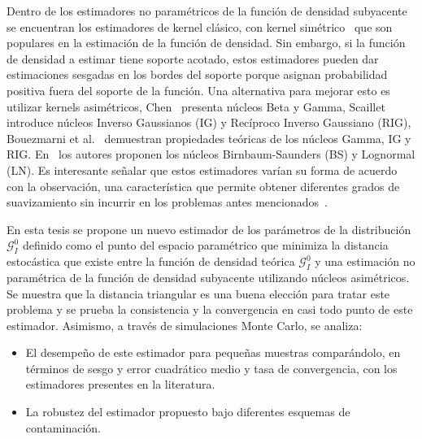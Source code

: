 Dentro de los estimadores no paramétricos de la función de densidad subyacente se encuentran los estimadores de kernel clásico, con kernel simétrico~\cite{Silverman1986} que son populares en la estimación de la función de densidad. Sin embargo, si la función de densidad a estimar tiene soporte acotado, estos estimadores pueden dar estimaciones sesgadas en los bordes del soporte porque asignan probabilidad positiva fuera del soporte de la función. Una alternativa para mejorar esto es utilizar kernels asimétricos, Chen~\cite{chen1999, chensx2000} presenta núcleos Beta y Gamma, Scaillet~\cite {Scaillet2004} introduce núcleos Inverso Gaussianos (IG) y Recíproco Inverso Gaussiano (RIG), Bouezmarni et al.~\cite {bouezmarni2005} demuestran propiedades teóricas de los núcleos Gamma, IG y RIG. En~\cite{Jin2003} los autores proponen los núcleos Birnbaum-Saunders (BS) y Lognormal (LN). Es interesante señalar que  estos estimadores varían su forma de acuerdo con la observación, una característica que permite obtener diferentes grados de suavizamiento sin incurrir en los problemas antes mencionados~\cite{Scaillet2004}. 

En esta tesis se propone un nuevo  estimador de los parámetros de la distribución $\mathcal{G}_I^0$ definido como el punto del espacio paramétrico que minimiza la distancia estocástica que existe entre la función de densidad teórica $\mathcal{G}_I^0$ y una estimación no paramétrica de la función de densidad subyacente utilizando núcleos asimétricos. Se muestra que la distancia triangular es una buena elección para tratar este problema y se prueba la consistencia y la convergencia en casi todo punto de este estimador. Asimismo, a través de simulaciones Monte Carlo, se analiza:

\begin{itemize}
	\item El desempeño de este estimador para pequeñas muestras comparándolo, en términos de sesgo y error cuadrático medio y tasa de convergencia, con los estimadores presentes en la literatura.
	\item La robustez del estimador propuesto bajo diferentes esquemas de contaminación.
\end{itemize}  

